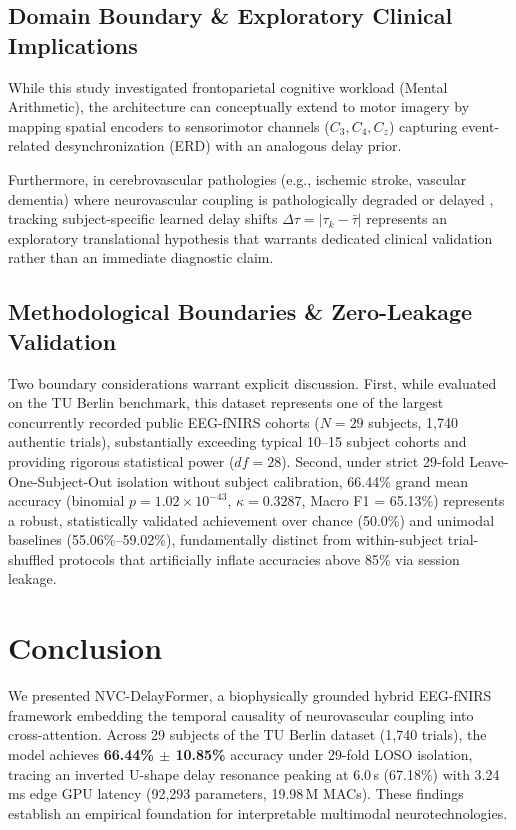 \documentclass[journal]{IEEEtran}
\begin{document}
\subsection{Domain Boundary \& Exploratory Clinical Implications}
While this study investigated frontoparietal cognitive workload (Mental Arithmetic), the architecture can conceptually extend to motor imagery by mapping spatial encoders to sensorimotor channels ($C_3, C_4, C_z$) capturing event-related desynchronization (ERD) \cite{pfurtscheller1999event} with an analogous delay prior. 

Furthermore, in cerebrovascular pathologies (e.g., ischemic stroke, vascular dementia) where neurovascular coupling is pathologically degraded or delayed \cite{girouard2006neurovascular}, tracking subject-specific learned delay shifts $\Delta \tau = |\tau_k - \bar{\tau}|$ represents an exploratory translational hypothesis that warrants dedicated clinical validation rather than an immediate diagnostic claim.

\subsection{Methodological Boundaries \& Zero-Leakage Validation}
Two boundary considerations warrant explicit discussion. First, while evaluated on the TU Berlin benchmark, this dataset represents one of the largest concurrently recorded public EEG-fNIRS cohorts ($N=29$ subjects, 1,740 authentic trials), substantially exceeding typical 10--15 subject cohorts and providing rigorous statistical power ($df=28$). Second, under strict 29-fold Leave-One-Subject-Out isolation without subject calibration, 66.44\% grand mean accuracy (binomial $p = 1.02 \times 10^{-43}$, $\kappa = 0.3287$, Macro F1 = 65.13\%) represents a robust, statistically validated achievement over chance (50.0\%) and unimodal baselines (55.06\%--59.02\%), fundamentally distinct from within-subject trial-shuffled protocols that artificially inflate accuracies above 85\% via session leakage.

\section{Conclusion}
We presented NVC-DelayFormer, a biophysically grounded hybrid EEG-fNIRS framework embedding the temporal causality of neurovascular coupling into cross-attention. Across 29 subjects of the TU Berlin dataset (1,740 trials), the model achieves \textbf{66.44\% $\pm$ 10.85\%} accuracy under 29-fold LOSO isolation, tracing an inverted U-shape delay resonance peaking at 6.0\,s (67.18\%) with 3.24\,ms edge GPU latency (92,293 parameters, 19.98\,M MACs). These findings establish an empirical foundation for interpretable multimodal neurotechnologies.

\balance


\end{document}
